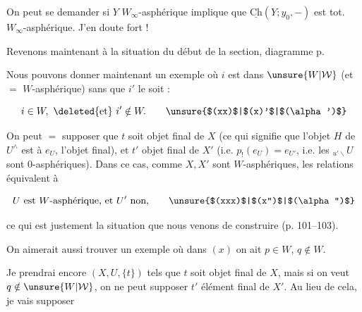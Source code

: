 
On peut se demander si $Y$ $W_\infty$-asphérique implique que $\underline{\mathrm{Ch}}(Y;y_0,-)$ est tot. $W_\infty$-asphérique. J'en doute fort !

Revenons maintenant à la situation du début de la section,  diagramme  p. 


Nous pouvons donner maintenant un exemple où $i$ est dans $\unsure{W|\mathcal W}$ (et $=$ $W$-asphérique) sans que $i'$ le soit :

\[
i\in W,\ \deleted{\text{et}}\ i'\notin W.\tag*{\unsure{$(xx)$|$(x)'$|$(\alpha')$}}
\]

On peut $=$ supposer que $t$ soit objet final de $X$ (ce qui signifie que l'objet $H$ de $U^\wedge$ est  à $e_U$, l'objet final), et $t'$ objet final de $X'$ (i.e. $p_!(e_U)=e_{U'}$, i.e. les $ {}_{u'\backslash}U$ sont 0-asphériques).  Dans ce cas, comme $X,X'$ sont $W$-asphériques, les relations  équivalent à

\[
U\text{ est }W\text{-asphérique, et }U'\text{ non,}\tag*{\unsure{$(xxx)$|$(x'')$|$(\alpha'')$}}
\]

ce qui est justement la situation que nous venons de construire (p. 101--103).

On aimerait aussi trouver un exemple où dans $(x)$ on ait $p\in W$, $q\notin W$.

Je prendrai encore $(X,U,\{t\})$ tels que $t$ soit objet final de $X$, mais si on veut $q\notin\unsure{W|\mathcal W}$, on ne peut supposer $t'$ élément final de $X'$. Au lieu de cela, je vais supposer

